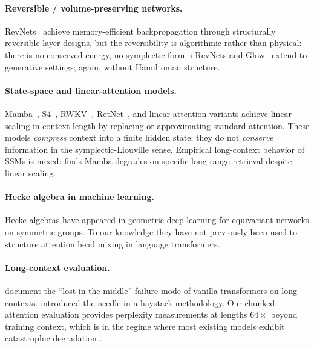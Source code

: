 \documentclass[11pt]{article}
\begin{document}
\paragraph{Reversible / volume-preserving networks.}
RevNets~\citep{gomez2017reversible} achieve memory-efficient
backpropagation through structurally reversible layer designs,
but the reversibility is algorithmic rather than physical: there
is no conserved energy, no symplectic form. i-RevNets
\citep{jacobsen2018irevnet} and Glow~\citep{kingma2018glow} extend
to generative settings; again, without Hamiltonian structure.

\paragraph{State-space and linear-attention models.}
Mamba~\citep{gu2023mamba}, S4~\citep{gu2021efficiently},
RWKV~\citep{peng2023rwkv}, RetNet~\citep{sun2023retentive}, and
linear attention variants achieve linear scaling in context length
by replacing or approximating standard attention. These models
\emph{compress} context into a finite hidden state; they do not
\emph{conserve} information in the symplectic-Liouville sense.
Empirical long-context behavior of SSMs is mixed:
\citet{waleffe2024empirical} finds Mamba degrades on specific
long-range retrieval despite linear scaling.

\paragraph{Hecke algebra in machine learning.}
Hecke algebras have appeared in geometric deep learning
\citep{kondor2018clebsch} for equivariant networks on symmetric
groups. To our knowledge they have not previously been used to
structure attention head mixing in language transformers.

\paragraph{Long-context evaluation.}
\citet{liu2024lost} document the ``lost in the middle'' failure
mode of vanilla transformers on long contexts.
\citet{kamradt2023needle} introduced the needle-in-a-haystack
methodology. Our chunked-attention evaluation provides perplexity
measurements at lengths $64\times$ beyond training context, which
is in the regime where most existing models exhibit catastrophic
degradation \citep{an2024lveval}.

\end{document}
